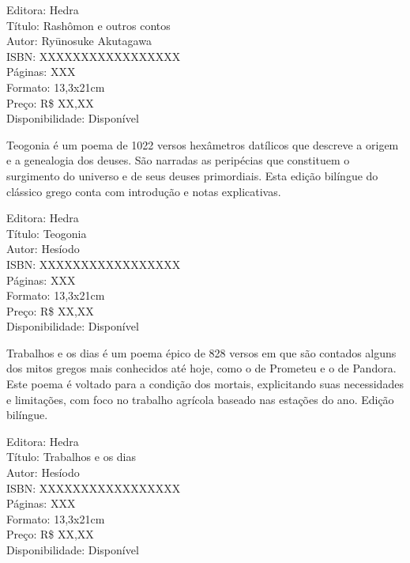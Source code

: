 \begin{ficha}
Editora: Hedra\\
Título: Rashômon e outros contos\\
Autor: Ryūnosuke Akutagawa\\ 
ISBN: XXXXXXXXXXXXXXXXX\\
Páginas: XXX\\
Formato: 13,3x21cm\\
Preço: R\$ XX,XX\\
Disponibilidade: Disponível
\end{ficha}

\pagebreak


\noindent{}Teogonia é um poema de 1022 versos hexâmetros datílicos que descreve a origem e a genealogia dos deuses. São narradas as peripécias que constituem o surgimento do universo e de seus deuses primordiais. Esta edição bilíngue do clássico grego conta com introdução e notas explicativas.

\begin{ficha}
Editora: Hedra\\
Título: Teogonia\\
Autor: Hesíodo\\ 
ISBN: XXXXXXXXXXXXXXXXX\\
Páginas: XXX\\
Formato: 13,3x21cm\\
Preço: R\$ XX,XX\\
Disponibilidade: Disponível
\end{ficha}

\pagebreak


\noindent{}Trabalhos e os dias é um poema épico de 828 versos em que são contados alguns dos mitos gregos mais conhecidos até hoje, como o de Prometeu e o de Pandora. Este poema é voltado para a condição dos mortais, explicitando suas necessidades e limitações, com foco no trabalho agrícola baseado nas estações do ano. Edição bilíngue.

\begin{ficha}
Editora: Hedra\\
Título: Trabalhos e os dias\\
Autor: Hesíodo\\ 
ISBN: XXXXXXXXXXXXXXXXX\\
Páginas: XXX\\
Formato: 13,3x21cm\\
Preço: R\$ XX,XX\\
Disponibilidade: Disponível
\end{ficha}

